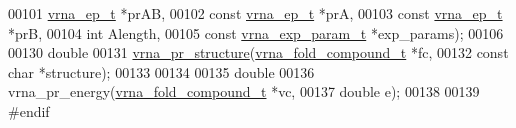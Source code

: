 \begin{DoxyCode}
00101                           \hyperlink{group__struct__utils__plist_structvrna__elem__prob__s}{vrna\_ep\_t}               *prAB,
00102                           \textcolor{keyword}{const} \hyperlink{group__struct__utils__plist_structvrna__elem__prob__s}{vrna\_ep\_t}         *prA,
00103                           \textcolor{keyword}{const} \hyperlink{group__struct__utils__plist_structvrna__elem__prob__s}{vrna\_ep\_t}         *prB,
00104                           \textcolor{keywordtype}{int}                     Alength,
00105                           \textcolor{keyword}{const} \hyperlink{group__energy__parameters_structvrna__exp__param__s}{vrna\_exp\_param\_t}  *exp\_params);
00106 
00130 \textcolor{keywordtype}{double}
00131 \hyperlink{group__part__func__global_ga882c35d9dd775c1275593b3b6a966bec}{vrna\_pr\_structure}(\hyperlink{group__fold__compound_structvrna__fc__s}{vrna\_fold\_compound\_t} *fc,
00132                   \textcolor{keyword}{const} \textcolor{keywordtype}{char} *structure);
00133 
00134 
00135 \textcolor{keywordtype}{double}
00136 vrna\_pr\_energy(\hyperlink{group__fold__compound_structvrna__fc__s}{vrna\_fold\_compound\_t} *vc,
00137                \textcolor{keywordtype}{double} e);
00138 
00139 \textcolor{preprocessor}{#endif}
\end{DoxyCode}
